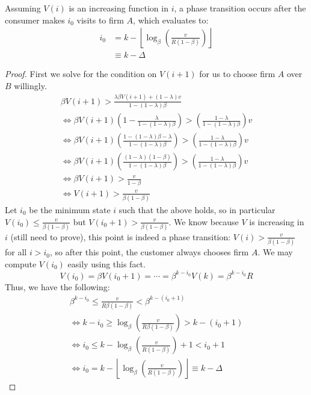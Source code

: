 \begin{theorem} Assuming $V(i)$ is an increasing function in $i$, a phase transition occurs after the consumer makes $i_0$ visits to firm $A$, which evaluates to:
\begin{align*}
i_0 &= k - \left\lfloor \log_{\beta}\left(\frac{v}{R(1-\beta)}\right)\right\rfloor \\
&\equiv k-\Delta
\end{align*}
\end{theorem}

\begin{proof}
First we solve for the condition on $V(i+1)$ for us to choose firm $A$ over $B$ willingly.
\begin{gather*}
\beta V(i+1) > \frac{\lambda \beta V(i+1) + (1-\lambda)v}{1-(1-\lambda)\beta} \\
\iff \beta V(i+1) \left(1-\frac{\lambda}{1-(1-\lambda)\beta} \right) > \left(\frac{1-\lambda}{1-(1-\lambda)\beta} \right) v \\
\iff \beta V(i+1) \left(\frac{1-(1-\lambda)\beta -\lambda}{1-(1-\lambda)\beta} \right) > \left(\frac{1-\lambda}{1-(1-\lambda)\beta} \right) v \\
\iff \beta V(i+1) \left(\frac{(1-\lambda)(1-\beta)}{1-(1-\lambda)\beta} \right) > \left(\frac{1-\lambda}{1-(1-\lambda)\beta} \right) v \\
\iff \beta V(i+1) > \frac{v}{1-\beta} \\
\iff V(i+1) > \frac{v}{\beta(1-\beta)}
\end{gather*}
Let $i_0$ be the minimum state $i$ such that the above holds, so in particular $V(i_0) \le \frac{v}{\beta(1-\beta)}$ but $V(i_0+1) > \frac{v}{\beta(1-\beta)}$. We know because $V$ is increasing in $i$ (still need to prove), this point is indeed a phase transition: $V(i) > \frac{v}{\beta(1-\beta)}$ for all $i > i_0$, so after this point, the customer always chooses firm $A$. We may compute $V(i_0)$ easily using this fact.
\begin{equation*}
V(i_0) = \beta V(i_0+1) = \cdots = \beta^{k-i_0}V(k) = \beta^{k-i_0}R
\end{equation*}
Thus, we have the following:
\begin{gather*}
\beta^{k-i_0} \le \frac{v}{R\beta(1-\beta)} < \beta^{k-(i_0+1)} \\ 
\iff k-i_0 \ge \log_{\beta}\left(\frac{v}{R\beta(1-\beta)} \right) > k-(i_0+1) \\
\iff i_0 \le k - \log_{\beta}\left(\frac{v}{R(1-\beta)} \right) + 1 < i_0 + 1\\
\iff i_0 = k - \left\lfloor \log_{\beta}\left(\frac{v}{R(1-\beta)}\right) \right\rfloor \equiv k-\Delta
\end{gather*}
\end{proof}

